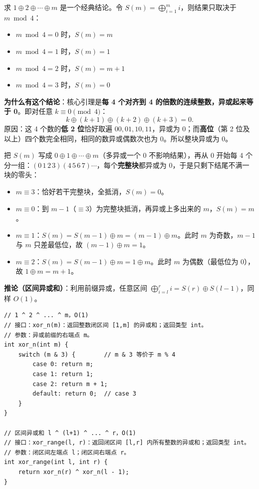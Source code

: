 \documentclass[UTF8,openany,oneside,zihao=-4]{ctexbook}
\begin{document}
\begin{note}
求 $1 \oplus 2 \oplus \cdots \oplus m$ 是一个经典结论。令 $S(m) = \bigoplus_{i=1}^{m} i$，则结果只取决于 $m \bmod 4$：
\begin{itemize}
  \item $m \bmod 4 = 0$ 时，$S(m) = m$
  \item $m \bmod 4 = 1$ 时，$S(m) = 1$
  \item $m \bmod 4 = 2$ 时，$S(m) = m + 1$
  \item $m \bmod 4 = 3$ 时，$S(m) = 0$
\end{itemize}

\textbf{为什么有这个结论}：核心引理是\textbf{每 4 个对齐到 4 的倍数的连续整数，异或起来等于 0}。即对任意 $k \equiv 0 \pmod 4$：
$$k \oplus (k+1) \oplus (k+2) \oplus (k+3) = 0.$$
原因：这 4 个数的\textbf{低 2 位}恰好取遍 $00,01,10,11$，异或为 $0$；而\textbf{高位}（第 2 位及以上）四个数完全相同，相同的数异或偶数次也为 $0$。所以整块异或为 $0$。

把 $S(m)$ 写成 $0 \oplus 1 \oplus \cdots \oplus m$（多异或一个 $0$ 不影响结果），再从 $0$ 开始每 4 个分一组：$(0\,1\,2\,3)(4\,5\,6\,7)\cdots$，每个\textbf{完整块}都异或为 $0$，于是只剩下结尾不满一块的零头：
\begin{itemize}
  \item $m \equiv 3$：恰好若干完整块，全抵消，$S(m) = 0$。
  \item $m \equiv 0$：到 $m-1$（$\equiv 3$）为完整块抵消，再异或上多出来的 $m$，$S(m) = m$。
  \item $m \equiv 1$：$S(m) = S(m-1) \oplus m = (m-1) \oplus m$。此时 $m$ 为奇数，$m-1$ 与 $m$ 只差最低位，故 $(m-1)\oplus m = 1$。
  \item $m \equiv 2$：$S(m) = S(m-1) \oplus m = 1 \oplus m$。此时 $m$ 为偶数（最低位为 $0$），故 $1 \oplus m = m + 1$。
\end{itemize}

\textbf{推论（区间异或和）}：利用前缀异或，任意区间 $\bigoplus_{i=l}^{r} i = S(r) \oplus S(l-1)$，同样 $O(1)$。
\end{note}

\begin{lstlisting}
// 1 ^ 2 ^ ... ^ m，O(1)
// 接口：xor_n(m)：返回整数闭区间 [1,m] 的异或和；返回类型 int。
// 参数：异或前缀的右端点 m。
int xor_n(int m) {
    switch (m & 3) {        // m & 3 等价于 m % 4
        case 0: return m;
        case 1: return 1;
        case 2: return m + 1;
        default: return 0;  // case 3
    }
}

// 区间异或和 l ^ (l+1) ^ ... ^ r，O(1)
// 接口：xor_range(l, r)：返回闭区间 [l,r] 内所有整数的异或和；返回类型 int。
// 参数：闭区间左端点 l；闭区间右端点 r。
int xor_range(int l, int r) {
    return xor_n(r) ^ xor_n(l - 1);
}
\end{lstlisting}
\end{document}
